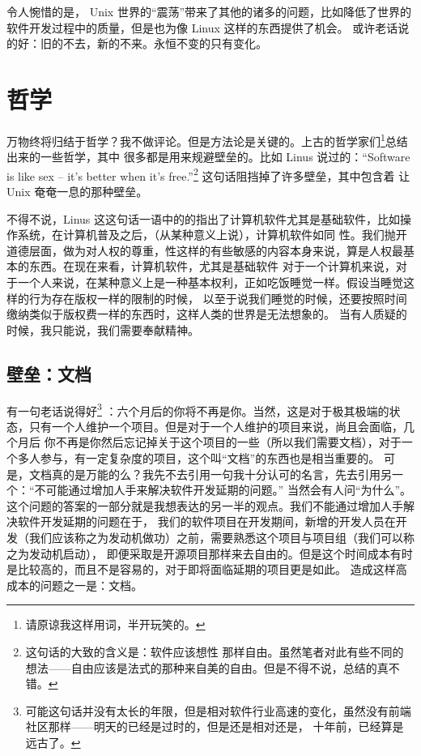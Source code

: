 \documentclass{ctexart}
\begin{document}
    令人惋惜的是， Unix 世界的“震荡”带来了其他的诸多的问题，比如降低了世界的软件开发过程中的质量，但是也为像 Linux 这样的东西提供了机会。
    或许老话说的好：旧的不去，新的不来。永恒不变的只有变化。

    \section{哲学}
    万物终将归结于哲学？我不做评论。但是方法论是关键的。上古的哲学家们\footnote{请原谅我这样用词，半开玩笑的。}总结出来的一些哲学，其中
    很多都是用来规避壁垒的。比如 Linus 说过的：“Software is like sex -- it's better when it's free.”\footnote{这句话的大致的含义是：软件应该想性
    那样自由。虽然笔者对此有些不同的想法——自由应该是法式的那种来自美的自由。但是不得不说，总结的真不错。} 这句话阻挡掉了许多壁垒，其中包含着 让
    Unix 奄奄一息的那种壁垒。

    不得不说，Linus 这这句话一语中的的指出了计算机软件尤其是基础软件，比如操作系统，在计算机普及之后，（从某种意义上说），计算机软件如同
    性。我们抛开道德层面，做为对人权的尊重，性这样的有些敏感的内容本身来说，算是人权最基本的东西。在现在来看，计算机软件，尤其是基础软件
    对于一个计算机来说，对于一个人来说，在某种意义上是一种基本权利，正如吃饭睡觉一样。假设当睡觉这样的行为存在版权一样的限制的时候，
    以至于说我们睡觉的时候，还要按照时间缴纳类似于版权费一样的东西时，这样人类的世界是无法想象的。
    当有人质疑的时候，我只能说，我们需要奉献精神。
    
    \subsection{壁垒：文档}
    有一句老话说得好\footnote{可能这句话并没有太长的年限，但是相对软件行业高速的变化，虽然没有前端社区那样——明天的已经是过时的，但是还是相对还是，
        十年前，已经算是远古了。}
    ：六个月后的你将不再是你。当然，这是对于极其极端的状态，只有一个人维护一个项目。但是对于一个人维护的项目来说，尚且会面临，几个月后
    你不再是你然后忘记掉关于这个项目的一些（所以我们需要文档），对于一个多人参与，有一定复杂度的项目，这个叫“文档”的东西也是相当重要的。
    可是，文档真的是万能的么？我先不去引用一句我十分认可的名言，先去引用另一个：“不可能通过增加人手来解决软件开发延期的问题。”
    当然会有人问“为什么”。这个问题的答案的一部分就是我想表达的另一半的观点。我们不能通过增加人手解决软件开发延期的问题在于，
    我们的软件项目在开发期间，新增的开发人员在开发（我们应该称之为发动机做功）之前，需要熟悉这个项目与项目组（我们可以称之为发动机启动），
    即便采取是开源项目那样来去自由的。但是这个时间成本有时是比较高的，而且不是容易的，对于即将面临延期的项目更是如此。
    造成这样高成本的问题之一是：文档。
\end{document}
